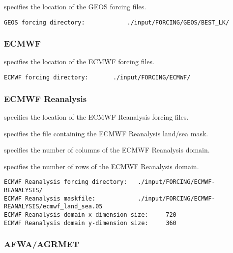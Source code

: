  
  specifies the location of the GEOS
 forcing files.
 

 \begin{Verbatim}[frame=single]
GEOS forcing directory:            ./input/FORCING/GEOS/BEST_LK/
 \end{Verbatim}

 
 \subsubsection{ECMWF} \label{sssec:forcings_ecmwf}
 

 
  specifies the location of the ECMWF
 forcing files.
 

 \begin{Verbatim}[frame=single]
ECMWF forcing directory:       ./input/FORCING/ECMWF/
 \end{Verbatim}

 
 \subsubsection{ECMWF Reanalysis} \label{sssec:forcings_ecmwf_reanalysis}
 

 
  specifies the location of
 the ECMWF Reanalysis forcing files.

  specifies the file containing
 the ECMWF Reanalysis land/sea mask.

  specifies the 
 number of columns of the ECMWF Reanalysis domain.

  specifies the 
 number of rows of the ECMWF Reanalysis domain.
 

 \begin{Verbatim}[frame=single]
ECMWF Reanalysis forcing directory:   ./input/FORCING/ECMWF-REANALYSIS/
ECMWF Reanalysis maskfile:            ./input/FORCING/ECMWF-REANALYSIS/ecmwf_land_sea.05
ECMWF Reanalysis domain x-dimension size:     720
ECMWF Reanalysis domain y-dimension size:     360
 \end{Verbatim}

 
 
 \subsubsection{AFWA/AGRMET} \label{sssec:forcings_afwa}
 

